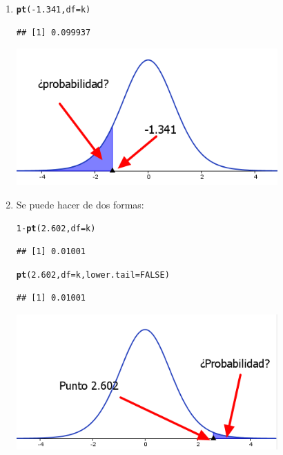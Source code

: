 \documentclass[10pt,a4paper]{article}\usepackage[]{graphicx}\usepackage[]{color}
\makeatletter
\newcommand{\hlnum}[1]{\textcolor[rgb]{0.686,0.059,0.569}{#1}}%
\newcommand{\hlopt}[1]{\textcolor[rgb]{0,0,0}{#1}}%
\newcommand{\hlstd}[1]{\textcolor[rgb]{0.345,0.345,0.345}{#1}}%
\newcommand{\hlkwc}[1]{\textcolor[rgb]{0.333,0.667,0.333}{#1}}%
\newcommand{\hlkwd}[1]{\textcolor[rgb]{0.737,0.353,0.396}{\textbf{#1}}}%
\newenvironment{kframe}{%
 \def\at@end@of@kframe{}%
 \ifinner\ifhmode%
  \def\at@end@of@kframe{\end{minipage}}%
  \begin{minipage}{\columnwidth}%
 \fi\fi%
 \def\FrameCommand##1{\hskip\@totalleftmargin \hskip-\fboxsep
 \colorbox{shadecolor}{##1}\hskip-\fboxsep
     \hskip-\linewidth \hskip-\@totalleftmargin \hskip\columnwidth}%
 \MakeFramed {\advance\hsize-\width
   \@totalleftmargin\z@ \linewidth\hsize
   \@setminipage}}%
 {\par\unskip\endMakeFramed%
 \at@end@of@kframe}
\newenvironment{knitrout}{}{} %
\makeatother
\begin{document}
\begin{enumerate}
  \item
\begin{knitrout}
\color{fgcolor}\begin{kframe}
\begin{alltt}
\hlkwd{pt}\hlstd{(}\hlopt{-}\hlnum{1.341}\hlstd{,} \hlkwc{df}\hlstd{=k)}
\end{alltt}
\begin{verbatim}
## [1] 0.099937
\end{verbatim}
\end{kframe}
\end{knitrout}
  \begin{center}
        \includegraphics[width=10cm]{../fig/Tut06-20.png}
  \end{center}


  \item
  Se puede hacer de dos formas:
\begin{knitrout}
\color{fgcolor}\begin{kframe}
\begin{alltt}
\hlnum{1} \hlopt{-} \hlkwd{pt}\hlstd{(}\hlnum{2.602}\hlstd{,} \hlkwc{df}\hlstd{=k)}
\end{alltt}
\begin{verbatim}
## [1] 0.01001
\end{verbatim}
\begin{alltt}
\hlkwd{pt}\hlstd{(}\hlnum{2.602}\hlstd{,} \hlkwc{df}\hlstd{=k,} \hlkwc{lower.tail}\hlstd{=}\hlnum{FALSE}\hlstd{)}
\end{alltt}
\begin{verbatim}
## [1] 0.01001
\end{verbatim}
\end{kframe}
\end{knitrout}
  \begin{center}
        \includegraphics[width=10cm]{../fig/Tut06-21.png}
  \end{center}


\end{enumerate}
\end{document}
